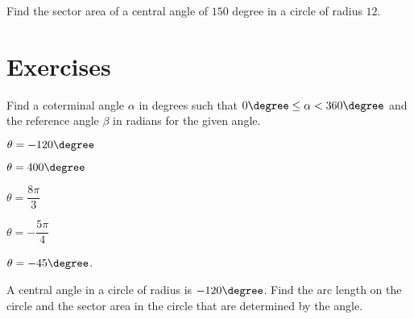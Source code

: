 \begin{example}
  Find the sector area of a central angle of $150$ degree in a circle of radius $12$.
\end{example}

\newpage
\section*{Exercises}

\begin{exercise}
    Find a coterminal angle $\alpha$ in degrees such that $0\degree\le \alpha<360\degree$ and the reference angle $\beta$ in radians for the given angle.
    \begin{enumerate*}
      \item $\theta=-120\degree$
      \item $\theta=400\degree$
      \item $\theta=\dfrac{8\pi}{3}$
      \item $\theta=-\dfrac{5\pi}{4}$
    \end{enumerate*}
    $\theta=-45\degree$.
\end{exercise}

\begin{exercise}
  A central angle in a circle of radius is $-120\degree$. Find the arc length on the circle and the sector area in the circle that are determined by the angle.
\end{exercise}

\newpage
